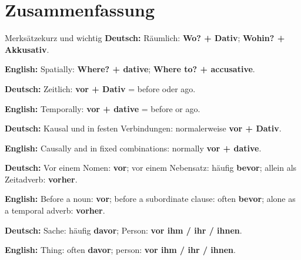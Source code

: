 \documentclass[a4paper,11pt]{article}
\newcommand{\GermanText}[1]{\textbf{Deutsch: }#1\par}
\newcommand{\EnglishText}[1]{{\small\color{SoftGray}\textbf{English: }#1\par}}
\begin{document}
    \section{Zusammenfassung}

        \begin{grammarentry}{Merksätze}{kurz und wichtig}
            \GermanText{Räumlich: \textbf{Wo? + Dativ}; \textbf{Wohin? + Akkusativ}.}
            \EnglishText{Spatially: \textbf{Where? + dative}; \textbf{Where to? + accusative}.}

            \GermanText{Zeitlich: \textbf{vor + Dativ} = before oder ago.}
            \EnglishText{Temporally: \textbf{vor + dative} = before or ago.}

            \GermanText{Kausal und in festen Verbindungen: normalerweise \textbf{vor + Dativ}.}
            \EnglishText{Causally and in fixed combinations: normally \textbf{vor + dative}.}

            \GermanText{Vor einem Nomen: \textbf{vor}; vor einem Nebensatz: häufig \textbf{bevor}; allein als Zeitadverb: \textbf{vorher}.}
            \EnglishText{Before a noun: \textbf{vor}; before a subordinate clause: often \textbf{bevor}; alone as a temporal adverb: \textbf{vorher}.}

            \GermanText{Sache: häufig \textbf{davor}; Person: \textbf{vor ihm / ihr / ihnen}.}
            \EnglishText{Thing: often \textbf{davor}; person: \textbf{vor ihm / ihr / ihnen}.}
        \end{grammarentry}
\end{document}
